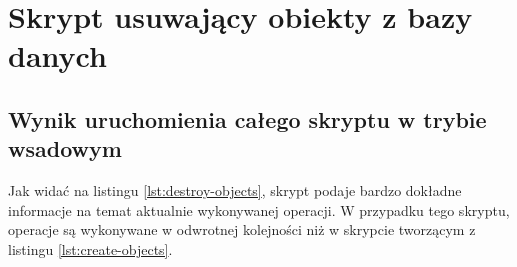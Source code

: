 \section{Skrypt usuwający obiekty z bazy danych}

\subsection{Wynik uruchomienia całego skryptu w trybie wsadowym}

Jak widać na listingu \ref{lst:destroy-objects}, skrypt podaje bardzo dokładne informacje na temat aktualnie wykonywanej operacji. W przypadku tego skryptu, operacje są wykonywane w odwrotnej kolejności niż w skrypcie tworzącym z listingu \ref{lst:create-objects}.

